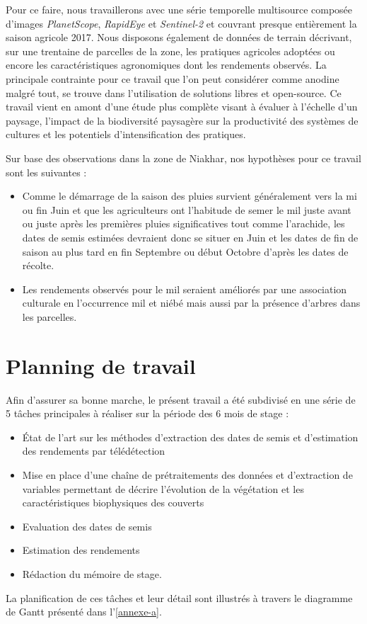\vspace{5mm} %

Pour ce faire, nous travaillerons avec une série temporelle multisource composée d'images \emph{PlanetScope}, \emph{RapidEye} et \emph{Sentinel-2} et couvrant presque entièrement 
la saison agricole 2017. Nous disposons également de données de terrain décrivant, sur une trentaine de parcelles de la zone, les pratiques agricoles adoptées ou encore les 
caractéristiques agronomiques dont les rendements observés. La principale contrainte pour ce travail que l'on peut considérer comme anodine malgré tout, se trouve dans l'utilisation 
de solutions libres et open-source. Ce travail vient en amont d'une étude plus complète visant à évaluer à l’échelle d’un paysage, l’impact de la biodiversité paysagère sur la productivité des 
systèmes de cultures et les potentiels d’intensification des pratiques.

\vspace{5mm} %

Sur base des observations dans la zone de Niakhar, nos hypothèses pour ce travail sont les suivantes :
  \begin{itemize}
   \item Comme le démarrage de la saison des pluies survient généralement vers la mi ou fin Juin et que les agriculteurs ont l'habitude de semer le mil juste avant ou juste après les premières pluies significatives tout comme l'arachide, les dates de semis estimées devraient donc se situer en Juin et les dates de fin de saison au plus tard en fin Septembre ou début Octobre d'après les dates de récolte. 
   \item Les rendements observés pour le mil seraient améliorés par une association culturale en l'occurrence mil et niébé mais aussi par la présence d'arbres dans les parcelles.
  \end{itemize}

\section{Planning de travail}
Afin d'assurer sa bonne marche, le présent travail a été subdivisé en une série de 5 tâches principales à réaliser sur la période des 6 mois de stage :
  \begin{itemize}
   \item \'Etat de l'art sur les méthodes d'extraction des dates de semis et d'estimation des rendements par télédétection
   \item Mise en place d'une chaîne de prétraitements des données et d'extraction de variables permettant de décrire l’évolution de la végétation et les caractéristiques biophysiques des couverts 
   \item Evaluation des dates de semis
   \item Estimation des rendements
   \item Rédaction du mémoire de stage.
  \end{itemize}
La planification de ces tâches et leur détail sont illustrés \`a travers le diagramme de Gantt présenté dans l'\cref{annexe-a}.

